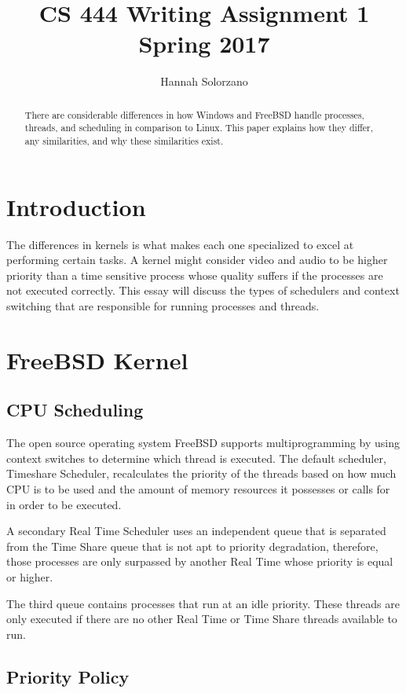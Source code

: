 \documentclass[10pt, draftclsnofoot,onecolumn]{IEEEtran}
\title{CS 444 Writing Assignment 1 \\ {\large Spring 2017}}
\author{Hannah Solorzano}
\begin{document}
\maketitle

\vfill
\begin{abstract}
There are considerable differences in how Windows and FreeBSD handle processes, threads, and scheduling in comparison to Linux. This paper explains how they differ, any similarities, and why these similarities exist.
\end{abstract}
\newpage

\section{Introduction}

The differences in kernels is what makes each one specialized to excel at performing certain tasks. A kernel might consider video and audio to be higher priority than a time sensitive process whose quality suffers if the processes are not executed correctly. This essay will discuss the types of schedulers and context switching that are responsible for running processes and threads. 

\section{FreeBSD Kernel}

\subsection{CPU Scheduling}

The open source operating system FreeBSD supports multiprogramming by using context switches to determine which thread is executed. The default scheduler, Timeshare Scheduler, recalculates the priority of the threads based on how much CPU is to be used and the amount of memory resources it possesses or calls for in order to be executed.\par
A secondary Real Time Scheduler uses an independent queue that is separated from the Time Share queue that is not apt to priority degradation, therefore, those processes are only surpassed by another Real Time whose priority is equal or higher.\par
The third queue contains processes that run at an idle priority. These threads are only executed if there are no other Real Time or Time Share threads available to run.

\subsection{Priority Policy}
\end{document}
